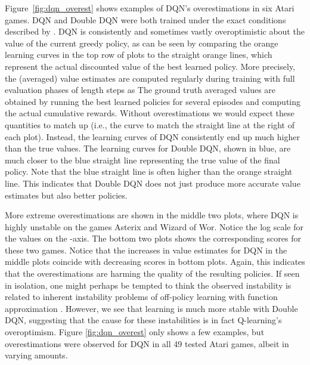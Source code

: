 \documentclass[letterpaper]{article}
\begin{document}
Figure~\ref{fig:dqn_overest} shows examples of DQN's overestimations in six Atari games. DQN and Double DQN were both trained under the exact conditions described by \citet{Mnih:2015}.  DQN is consistently and sometimes vastly overoptimistic about the value of the current greedy policy, as can be seen by comparing the orange learning curves in the top row of plots to the straight orange lines, which represent the actual discounted value of the best learned policy.  
More precisely, the (averaged) value estimates are computed regularly during training with full evaluation phases of length  steps as
The ground truth averaged values are obtained by running the best learned policies for several episodes and computing the actual cumulative rewards.      
Without overestimations we would expect these quantities to match up (i.e., the curve to match the straight line at the right of each plot).  Instead, the learning curves of DQN consistently end up much higher than the true values.  The learning curves for Double DQN, shown in blue, are much closer to the blue straight line representing the true value of the final policy.  Note that the blue straight line is often higher than the orange straight line.  This indicates that Double DQN does not just produce more accurate value estimates but also better policies.

More extreme overestimations are shown in the middle two plots, where DQN is highly unstable on the games Asterix and Wizard of Wor.  Notice the log scale for the values on the -axis.  The bottom two plots shows the corresponding scores for these two games.  Notice that the increases in value estimates for DQN in the middle plots coincide with decreasing scores in bottom plots.  Again, this indicates that the overestimations are harming the quality of the resulting policies.
If seen in isolation, one might perhaps be tempted to think the observed instability is related to inherent instability problems of off-policy learning with function approximation \citep{Baird:1995,Tsitsiklis:1997,Sutton:2008,Maei:2011,Sutton:2015}.  However, we see that learning is much more stable with Double DQN, suggesting that the cause for these instabilities is in fact Q-learning's overoptimism.
Figure \ref{fig:dqn_overest} only shows a few examples, but overestimations were observed for DQN in all 49 tested Atari games, albeit in varying amounts.
\end{document}
